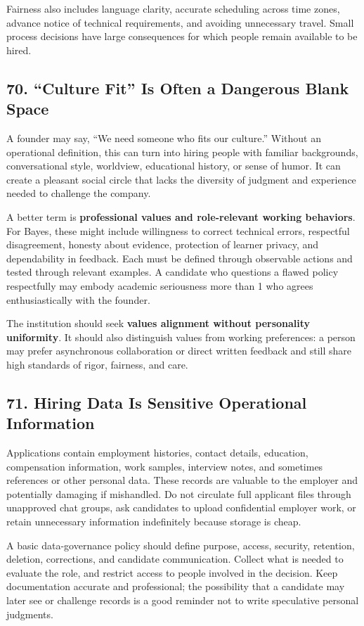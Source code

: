 Fairness also includes language clarity, accurate scheduling across time zones, advance notice of technical requirements, and avoiding unnecessary travel. Small process decisions have large consequences for which people remain available to be hired.

\subsection*{70. ``Culture Fit'' Is Often a Dangerous Blank Space}

A founder may say, ``We need someone who fits our culture.'' Without an operational definition, this can turn into hiring people with familiar backgrounds, conversational style, worldview, educational history, or sense of humor. It can create a pleasant social circle that lacks the diversity of judgment and experience needed to challenge the company.

A better term is \textbf{professional values and role-relevant working behaviors}. For Bayes, these might include willingness to correct technical errors, respectful disagreement, honesty about evidence, protection of learner privacy, and dependability in feedback. Each must be defined through observable actions and tested through relevant examples. A candidate who questions a flawed policy respectfully may embody academic seriousness more than 1 who agrees enthusiastically with the founder.

The institution should seek \textbf{values alignment without personality uniformity}. It should also distinguish values from working preferences: a person may prefer asynchronous collaboration or direct written feedback and still share high standards of rigor, fairness, and care.

\subsection*{71. Hiring Data Is Sensitive Operational Information}

Applications contain employment histories, contact details, education, compensation information, work samples, interview notes, and sometimes references or other personal data. These records are valuable to the employer and potentially damaging if mishandled. Do not circulate full applicant files through unapproved chat groups, ask candidates to upload confidential employer work, or retain unnecessary information indefinitely because storage is cheap.

A basic data-governance policy should define purpose, access, security, retention, deletion, corrections, and candidate communication. Collect what is needed to evaluate the role, and restrict access to people involved in the decision. Keep documentation accurate and professional; the possibility that a candidate may later see or challenge records is a good reminder not to write speculative personal judgments.

